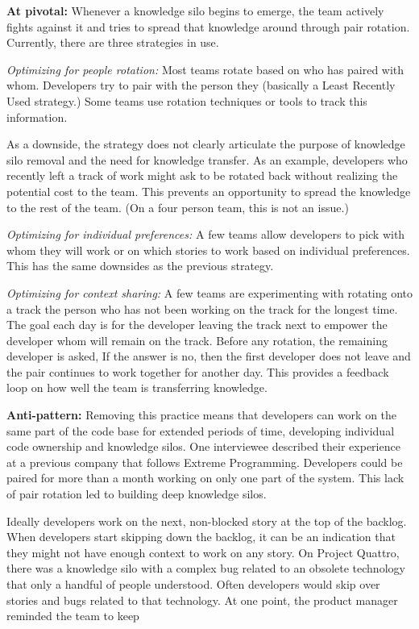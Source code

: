 \textbf{At pivotal:} Whenever a knowledge silo begins to emerge, the team actively fights against it and tries to spread that knowledge around through pair rotation.  Currently, there are three strategies in use. 

\textit{Optimizing for people rotation:} Most teams rotate based on who has paired with whom. Developers try to pair with the person they  (basically a Least Recently Used strategy.) Some teams use rotation techniques or tools to track this information.

As a downside, the strategy does not clearly articulate the purpose of knowledge silo removal and the need for knowledge transfer. As an example, developers who recently left a track of work might ask to be rotated back without realizing the potential cost to the team. This prevents an opportunity to spread the knowledge to the rest of the team. (On a four person team, this is not an issue.)

\textit{Optimizing for individual preferences:} A few teams allow developers to pick with whom they will work or on which stories to work based on individual preferences. This has the same downsides as the previous strategy. 

\textit{Optimizing for context sharing:} A few teams are experimenting with rotating onto a track the person who has not been working on the track for the longest time. The goal each day is for the developer leaving the track next to empower the developer whom will remain on the track. Before any rotation, the remaining developer is asked,  If the answer is no, then the first developer does not leave and the pair continues to work together for another day. This provides a feedback loop on how well the team is transferring knowledge. 

\textbf{Anti-pattern:} Removing this practice means that developers can work on the same part of the code base for extended periods of time, developing individual code ownership and knowledge silos. One interviewee described their experience at a previous company that follows Extreme Programming. Developers could be paired for more than a month working on only one part of the system. This lack of pair rotation led to building deep knowledge silos. 

Ideally developers work on the next, non-blocked story at the top of the backlog. When developers start skipping down the backlog, it can be an indication that they might not have enough context to work on any story. On Project Quattro, there was a knowledge silo with a complex bug related to an obsolete technology that only a handful of people understood. Often developers would skip over stories and bugs related to that technology. At one point, the product manager reminded the team to keep 

